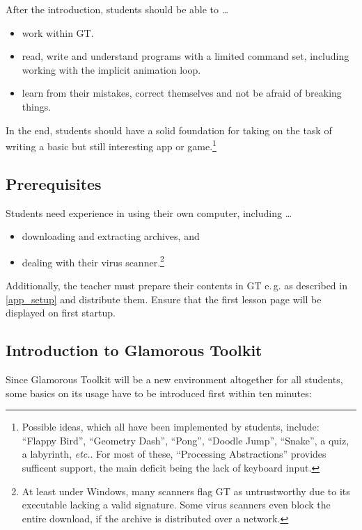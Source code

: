 After the introduction, students should be able to \dots
\begin{itemize}
\item work within GT.
\item read, write and understand programs with a limited command set, including working with the implicit animation loop.
\item learn from their mistakes, correct themselves and not be afraid of breaking things.
\end{itemize}

In the end, students should have a solid foundation for taking on the task of writing a basic but still interesting app or game.\footnote{Possible ideas, which all have been implemented by students, include: ``Flappy Bird'', ``Geometry Dash'', ``Pong'', ``Doodle Jump'', ``Snake'', a quiz, a labyrinth, \emph{etc.}. For most of these, ``Processing Abstractions'' provides sufficent support, the main deficit being the lack of keyboard input.}


\subsection{Prerequisites}

Students need experience in using their own computer, including \dots
\begin{itemize}
\item downloading and extracting archives, and
\item dealing with their virus scanner.\footnote{At least under Windows, many scanners flag GT as untrustworthy due to its executable lacking a valid signature. Some virus scanners even block the entire download, if the archive is distributed over a network.}
\end{itemize}

Additionally, the teacher must prepare their contents in GT e.\,g. as described in \ref{app_setup} and distribute them. Ensure that the first lesson page will be displayed on first startup.


\subsection{Introduction to Glamorous Toolkit} \label{ssc_lesson_gt}

Since Glamorous Toolkit will be a new environment altogether for all students, some basics on its usage have to be introduced first within ten minutes:

